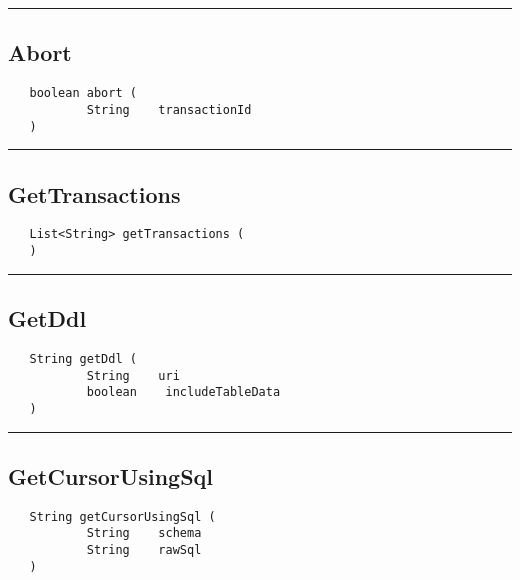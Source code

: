 \rule{15cm}{2pt}
\subsection{Abort}
\label{Api:Abort}
\begin{verbatim}
   boolean abort (
           String    transactionId
   )
\end{verbatim}



\rule{15cm}{2pt}
\subsection{GetTransactions}
\label{Api:GetTransactions}
\begin{verbatim}
   List<String> getTransactions (
   )
\end{verbatim}



\rule{15cm}{2pt}
\subsection{GetDdl}
\label{Api:GetDdl}
\begin{verbatim}
   String getDdl (
           String    uri
           boolean    includeTableData
   )
\end{verbatim}



\rule{15cm}{2pt}
\subsection{GetCursorUsingSql}
\label{Api:GetCursorUsingSql}
\begin{verbatim}
   String getCursorUsingSql (
           String    schema
           String    rawSql
   )
\end{verbatim}



